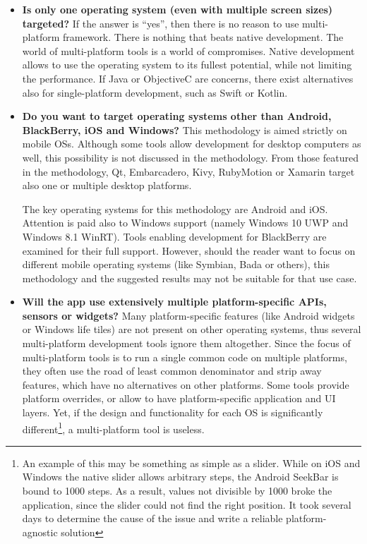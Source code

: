 \documentclass[english,master,public,dept460,male,cpdeclaration,oneside]{diploma}
\begin{document}
\begin{itemize}
	\item \textbf{Is only one operating system (even with multiple screen sizes) targeted?} 
	If the answer is “yes”, then there is no reason to use multi-platform framework. There is nothing that beats native development. The world of multi-platform tools is a world of compromises. Native development allows to use the operating system to its fullest potential, while not limiting the performance. If Java or ObjectiveC are concerns, there exist alternatives also for single-platform development, such as Swift or Kotlin.
	
	\item \textbf{Do you want to target operating systems other than Android, BlackBerry, iOS and Windows?} 
	This methodology is aimed strictly on mobile OSs. Although some tools allow development for desktop computers as well, this possibility is not discussed in the methodology. From those featured in the methodology, Qt, Embarcadero, Kivy, RubyMotion or Xamarin target also one or multiple desktop platforms. 
	
	The key operating systems for this methodology are Android and iOS. Attention is paid also to Windows support (namely Windows 10 UWP and Windows 8.1 WinRT). Tools enabling development for BlackBerry are examined for their full support. However, should the reader want to focus on different mobile operating systems (like Symbian, Bada or others), this methodology and the suggested results may not be suitable for that use case.
	
	\item \textbf{Will the app use extensively multiple platform-specific APIs, sensors or widgets?} 
	Many platform-specific features (like Android widgets or Windows life tiles) are not present on other operating systems, thus several multi-platform development tools ignore them altogether. Since the focus of multi-platform tools is to run a single common code on multiple platforms, they often use the road of least common denominator and strip away features, which have no alternatives on other platforms. Some tools provide platform overrides, or allow to have platform-specific application and UI layers. Yet, if the design and functionality for each OS is significantly different\footnote{An example of this may be something as simple as a slider. While on iOS and Windows the native slider allows arbitrary steps, the Android SeekBar is bound to 1000 steps. As a result, values not divisible by 1000 broke the application, since the slider could not find the right position. It took several days to determine the cause of the issue and write a reliable platform-agnostic solution}, a multi-platform tool is useless. 
	

\end{itemize}
\end{document}
